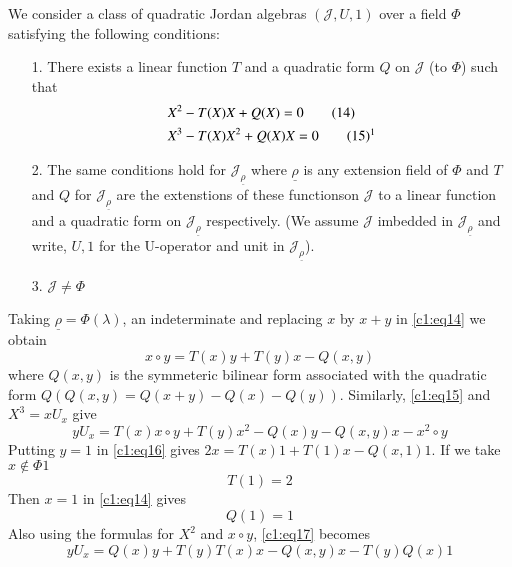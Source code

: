 We consider a class of quadratic Jordan algebras $(\mathscr{J},U,1)$
over a field $\Phi$ satisfying the following conditions:
\begin{itemize}
\item[1.] There exists a linear function $T$ and a quadratic form $Q$
  on $\mathscr{J}$ (to $\Phi$) such that
\begin{align*}
  &X^{2}-T(X)X+Q(X)=0\tag{14}\label{c1:eq14}\\
  &X^{3}-T(X)X^{2}+Q(X)X=0\tag{15}\label{c1:eq15}\footnotemark[1]
\end{align*}
\item[2.] The same conditions hold for
  $\mathscr{J}_{\underline{\rho}}$ where $\underline{\rho}$ is any
  extension field of $\Phi$ and $T$ and $Q$ for
  $\mathscr{J}_{\underline{\rho}}$ are the extenstions of these
  functions\pageoriginale on $\mathscr{J}$ to a linear function and a
  quadratic form on $\mathscr{J}_{\underline{\rho}}$ respectively. (We
  assume $\mathscr{J}$ imbedded in $\mathscr{J}_{\underline{\rho}}$
  and write, $U, 1$ for the U-operator and unit in
  $\mathscr{J}_{\underline{\rho}}$).
\item[3.] $\mathscr{J}\neq \Phi$
\end{itemize}
Taking $\underline{\rho}=\Phi(\lambda)$, an indeterminate and
replacing $x$ by $x+y$ in \eqref{c1:eq14} we obtain
\begin{equation*}
x\circ y =T(x)y+T(y)x-Q(x,y)\tag{16}\label{c1:eq16}
\end{equation*}
where $Q(x,y)$ is the symmeteric bilinear form associated with the
qua\-dra\-tic form $Q(Q(x,y)=Q(x+y)-Q(x)-Q(y))$. Similarly, \eqref{c1:eq15} and
$X^{3}=xU_x$ give
\begin{equation*}
yU_x=T(x)x\circ y + T(y) x^{2}-Q(x)y-Q(x,y)x-x^{2}\circ y\tag{17}\label{c1:eq17}
\end{equation*}
Putting $y=1$ in \eqref{c1:eq16} gives $2x=T(x)1+T(1)x-Q(x,1)1$. If we take
$x\notin \Phi 1$
\begin{equation*}
  T(1)=2\tag{18}\label{c1:eq18}
\end{equation*}
Then $x=1$ in \eqref{c1:eq14} gives
\begin{equation*}
  Q(1)=1\tag{19}\label{c1:eq19}
\end{equation*}
Also using the formulas for $X^{2}$ and $x\circ y$, \eqref{c1:eq17} becomes
\begin{equation*}
  yU_x=Q(x)y+T(y)T(x)x-Q(x,y)x-T(y)Q(x)1\tag{20}\label{c1:eq20}
\end{equation*}

